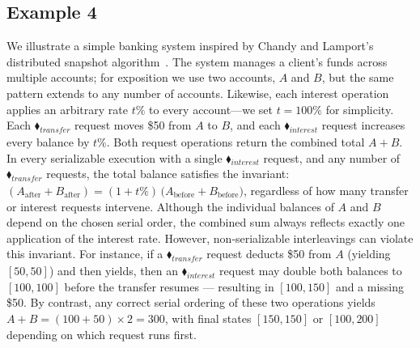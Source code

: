 	
\subsection{Example 4}


We illustrate a simple banking system inspired by Chandy and Lamport’s distributed snapshot algorithm~\cite{ChLa85}.  The system manages a client’s funds across multiple accounts; for exposition we use two accounts, \(A\) and \(B\), but the same pattern extends to any number of accounts.  Likewise, each interest operation applies an arbitrary rate \(t\%\) to every account—we set \(t=100\%\) for simplicity.
%
Each {\color{ForestGreen}$\blacklozenge_{\mathit{transfer}}$} request moves \$50 from \(A\) to \(B\), and each {\color{ForestGreen}$\blacklozenge_{\mathit{interest}}$} request increases every balance by \(t\%\).  Both request operations return the combined total \(A + B\).
%
In every serializable execution with a single {\color{ForestGreen}$\blacklozenge_{\mathit{interest}}$} request, and any number of {\color{ForestGreen}$\blacklozenge_{\mathit{transfer}}$} requests, the total balance satisfies the invariant:
$
(A_{\text{after}} + B_{\text{after}})
= (1 + t\%) \,\bigl(A_{\text{before}} + B_{\text{before}}\bigr)
$,
%
%
regardless of how many transfer or interest requests intervene.  Although the individual balances of \(A\) and \(B\) depend on the chosen serial order, the combined sum always reflects exactly one application of the interest rate.
%
However, non‐serializable interleavings can violate this invariant.  For instance, if a {\color{ForestGreen}$\blacklozenge_{\mathit{transfer}}$} request deducts \$50 from \(A\) (yielding \([50,50]\)) and then yields, then an {\color{ForestGreen}$\blacklozenge_{\mathit{interest}}$} request may double both balances to \([100,100]\) before the transfer resumes --- resulting in \([100,150]\) and a missing \$50.  By contrast, any correct serial ordering of these two operations yields \(A + B = (100+50)\times2 = 300\), with final states \([150,150]\) or \([100,200]\) depending on which request runs first.
%
%
